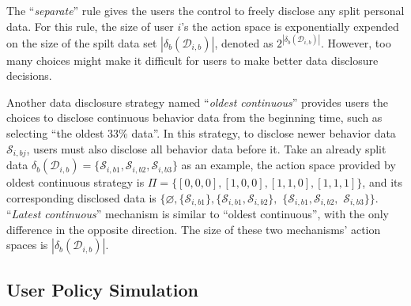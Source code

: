 The ``\textit{separate}'' rule gives the users the control to freely disclose any split personal data.
For this rule, the size of user $i$'s the action space is exponentially expended on the size of the spilt data set $|\delta_b ({\scriptstyle \mathcal{D}_{i,b}})|$, denoted as $2^{|\delta_b ({\scriptstyle \mathcal{D}_{i,b}})|}$. 
However, too many choices might make it difficult for users to make better data disclosure decisions.

Another data disclosure strategy named ``\textit{oldest continuous}'' provides users the choices to disclose continuous behavior data from the beginning time, such as selecting ``the oldest 33\% data''.
In this strategy, to disclose newer behavior data ${\scriptstyle \mathcal{S}_{i,bj}}$, users must also disclose all behavior data before it.
Take an already split data $\delta_b ({\scriptstyle \mathcal{D}_{i,b}}) = \{\scriptstyle \mathcal{S}_{i,b1}, \scriptstyle \mathcal{S}_{i,b2}, \scriptstyle \mathcal{S}_{i,b3}\}$ as an example, the action space provided by oldest continuous strategy is $\Pi = \{[0,0,0], [1,0,0], [1,1,0], [1,1,1]\}$, and its corresponding disclosed data is $\{\varnothing ,
    \{\! {\scriptstyle \mathcal{S}_{i,b1}} \!\},
    \{\! {\scriptstyle \mathcal{S}_{i,b1}} , {\scriptstyle \mathcal{S}_{i,b2}}\! \},$
    $\{ {\scriptstyle \mathcal{S}_{i,b1}}, {\!\scriptstyle \mathcal{S}_{i,b2}},$ ${\scriptstyle \mathcal{S}_{i,b3}}\} \}$.
``\textit{Latest continuous}'' mechanism is similar to ``oldest continuous'', with the only difference in the opposite direction.
The size of these two mechanisms' action spaces is $|\delta_b ({\scriptstyle \mathcal{D}_{i,b}})|$.









\subsection{User Policy Simulation}
\label{sec:user}


